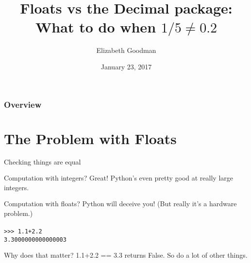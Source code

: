 \documentclass{beamer}
\title[$1/5 \ne 0.2$]{Floats vs the Decimal package: What to do when $1/5 \ne 0.2$} %
\author{Elizabeth Goodman} %
\institute[Hackbright] %
{
Hackbright Academy \\ %
\medskip
\textit{elizabethsqg@gmail.com} %
}
\date{January 23, 2017} %
\begin{document}
\begin{frame}
\maketitle
\end{frame}

\begin{frame}
\frametitle{Overview} %
\tableofcontents %
\end{frame}


\section{The Problem with Floats} %

\begin{frame}{Checking things are equal}

\begin{block}{Computation with integers?  Great!}
Python's even pretty good at really large integers.
\end{block}

\begin{block}{Computation with floats?  Python will deceive you!}
(But really it's a hardware problem.)\\
~\\
\pause
\texttt{>>> 1.1+2.2}\\
\texttt{3.3000000000000003}
\end{block}
\begin{block}{Why does that matter?}
1.1+2.2 == 3.3 returns False.  So do a lot of other things.
\end{block}
\end{frame}
\end{document}

